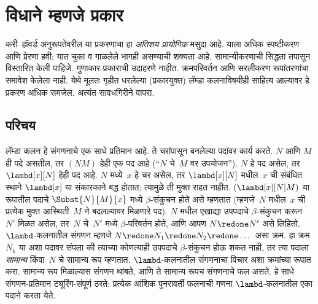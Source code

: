 \chapter{विधाने म्हणजे प्रकार}\label{int:pty:chap}
\begin{editorial}
  करी--हॉवर्ड अनुरूपतेवरील या प्रकरणाचा हा \emph{अतिशय प्रायोगिक}
  मसुदा आहे. याला अधिक स्पष्टीकरण आणि प्रेरणा हवी; यात चुका
  व गाळलेले भागही असण्याची शक्यता आहे. सामान्यीकरणाची सिद्धता
  तपासून विस्तारित केली पाहिजे. गुणाकार-प्रकाराची उदाहरणे नाहीत.
  क्रमपरिवर्तन आणि सरलीकरण रूपांतरणांचा समावेश केलेला नाही.
  येथे मूलतः गृहीत धरलेल्या (प्रकारयुक्त) लॅम्डा कलनाविषयीही
  साहित्य आल्यावर हे प्रकरण अधिक समजेल. अत्यंत सावधगिरीने वापरा.
\end{editorial}









\section{परिचय}\label{int:pty:int:sec}

लॅम्डा कलन हे संगणनाचे एक साधे प्रतिमान आहे. ते चरांपासून
बनलेल्या पदांवर कार्य करते. $N$ आणि $M$ ही पदे असतील, तर
$(NM)$ हेही एक पद आहे (``$N$ चे~$M$ वर उपयोजन''). $N$ हे पद
असेल, तर $\lambd[x][N]$ हेही पद आहे. $N$ मध्ये~$x$ हे चर
असेल, तर $\lambd[x][N]$ मधील~$x$ ची संबंधित स्थाने
$\lambd[x]$ या संकारकाने बद्ध होतात; त्यामुळे ती मुक्त राहत
नाहीत. $(\lambd[x][N]M)$ या रूपातील पदाचे
$\Subst{N}{M}{x}$ मध्ये $\beta$-संकुचन होते असे म्हणतात
(म्हणजे~$N$ मधील~$x$ ची प्रत्येक मुक्त आस्थिती~$M$ ने
बदलल्यावर मिळणारे पद). $N$ मधील एखाद्या उपपदाचे
$\beta$-संकुचन करून~$N'$ मिळत असेल, तर~$N$ चे~$N'$ मध्ये
$\beta$-परिवर्तन होते, आणि आपण $N \redone N'$ असे लिहितो.
$\lambd$-कलनातील संगणन म्हणजे
$N \redone N_1 \redone N_2 \redone \dots$ असा क्रम.
हा क्रम~$N_k$ या अशा पदावर संपला की त्याच्या कोणत्याही
उपपदाचे $\beta$-संकुचन होऊ शकत नाही, तर त्या पदाला
\emph{सामान्य} किंवा~$N$ चे सामान्य रूप म्हणतात.
$\lambd$-कलनातील संगणनाचा विचार अशा क्रमांच्या रूपात करा.
सामान्य रूप मिळाल्यास संगणन थांबते, आणि ते सामान्य रूपच
संगणनाचे फल असते. हे साधे संगणन-प्रतिमान ट्यूरिंग-संपूर्ण
ठरते: प्रत्येक आंशिक पुनरावर्ती फलनाची गणना
$\lambd$-कलनातील एका पदाने करता येते.

